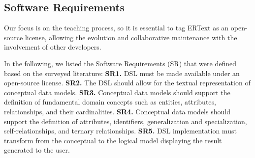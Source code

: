 \documentclass[a4paper,twoside,anonymous]{article}
\begin{document}
\subsection{Software Requirements} \label{sec:reqDSL}

Our focus is on the teaching process, so it is essential to tag ERText as an open-source license, allowing the evolution and collaborative maintenance with the involvement of other developers.

In the following, we listed the Software Requirements (SR) that were defined based on the surveyed literature: %
\textbf{SR1.} DSL must be made available under an open-source license.
\textbf{SR2.} The DSL should allow for the textual representation of conceptual data models.
\textbf{SR3.} Conceptual data models should support the definition of fundamental domain concepts such as entities, attributes, relationships, and their cardinalities.
\textbf{SR4.} Conceptual data models should support the definition of attributes, identifiers, generalization and specialization, self-relationships, and ternary relationships.
\textbf{SR5.} DSL implementation must transform from the conceptual to the logical model displaying the result generated to the user.
\end{document}
